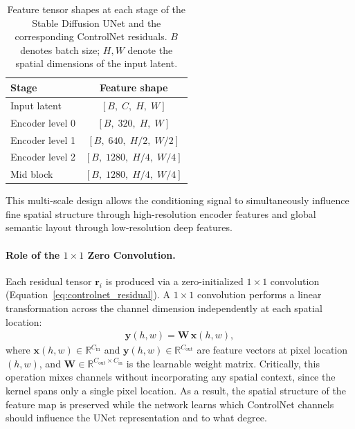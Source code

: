 \begin{table}[h]
\centering
\caption{Feature tensor shapes at each stage of the Stable Diffusion UNet and the corresponding ControlNet residuals. $B$ denotes batch size; $H, W$ denote the spatial dimensions of the input latent.}
\label{tab:controlnet_feature_shapes}
\begin{tabular}{lc}
\toprule
\textbf{Stage} & \textbf{Feature shape} \\
\midrule
Input latent         & $[B,\; C,\; H,\; W]$ \\
Encoder level 0      & $[B,\; 320,\; H,\; W]$ \\
Encoder level 1      & $[B,\; 640,\; H/2,\; W/2]$ \\
Encoder level 2      & $[B,\; 1280,\; H/4,\; W/4]$ \\
Mid block            & $[B,\; 1280,\; H/4,\; W/4]$ \\
\bottomrule
\end{tabular}
\end{table}

This multi-scale design allows the conditioning signal to simultaneously influence fine spatial structure through high-resolution encoder features and global semantic layout through low-resolution deep features.

\paragraph{Role of the $1 \times 1$ Zero Convolution.}
Each residual tensor $\mathbf{r}_i$ is produced via a zero-initialized $1 \times 1$ convolution (Equation~\eqref{eq:controlnet_residual}). A $1 \times 1$ convolution performs a linear transformation across the channel dimension independently at each spatial location:
\begin{align}
    \mathbf{y}(h, w) = \mathbf{W}\,\mathbf{x}(h, w),
    \label{eq:pointwise_conv}
\end{align}
where $\mathbf{x}(h, w) \in \mathbb{R}^{C_{\mathrm{in}}}$ and $\mathbf{y}(h, w) \in \mathbb{R}^{C_{\mathrm{out}}}$ are feature vectors at pixel location $(h, w)$, and $\mathbf{W} \in \mathbb{R}^{C_{\mathrm{out}} \times C_{\mathrm{in}}}$ is the learnable weight matrix. Critically, this operation mixes channels without incorporating any spatial context, since the kernel spans only a single pixel location. As a result, the spatial structure of the feature map is preserved while the network learns which ControlNet channels should influence the UNet representation and to what degree.

